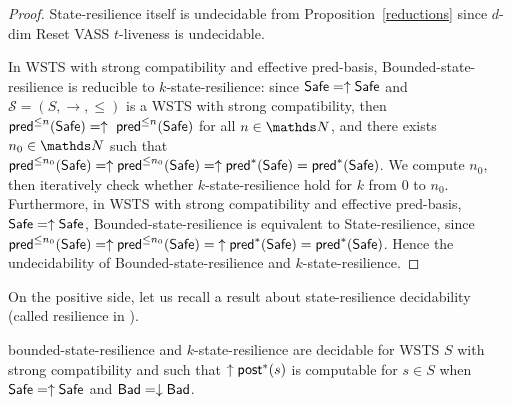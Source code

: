 \begin{proof}
{\sc State-resilience} itself is undecidable from Proposition~\ref{reductions} since {$d$-dim Reset VASS $t$-liveness} is undecidable.


In WSTS with strong compatibility and effective pred-basis, {\sc Bounded-state-resilience} is
reducible to {\sc $k$-state-resilience}:
% 
since $\Safe=\uparrow \Safe$ and
$\mathscr{S}=(S,\rightarrow,\leq)$ is a WSTS with strong %
compatibility, then $\textsf{pred}^{\leq n}(\textsf{Safe})= \uparrow~\textsf{pred}^{\leq n}(\textsf{Safe})$ for all $n \in \N$,
and there exists $n_0 \in \N$ such that 
$\textsf{pred}^{\leq n_0}(\textsf{Safe}) = \uparrow \textsf{pred}^{\leq n_0}(\textsf{Safe}) = \uparrow \textsf{pred}^*(\textsf{Safe}) = \textsf{pred}^*(\textsf{Safe})$.
We compute 
$n_0$, then iteratively check whether $k$-state-resilience 
hold for $k$ from $0$ to $n_0$.  
Furthermore, in WSTS with strong compatibility and effective pred-basis,  $\Safe=\uparrow \Safe$, {\sc Bounded-state-resilience} is equivalent to {\sc State-resilience},
%
since 
$\textsf{pred}^{\leq n_0}(\textsf{Safe}) = \uparrow \textsf{pred}^{\leq n_0}(\textsf{Safe}) = {\uparrow \textsf{pred}^*(\textsf{Safe})} = \textsf{pred}^*(\textsf{Safe})$.
Hence the %
 undecidability of {\sc Bounded-state-resilience}
and 
 {\sc $k$-state-resilience}.
%
%
\iffalse
Bounded state-resilience and 
$k$ state-resilience are undecidable for strongly compatible WSTS with effective pred-basis
when
$\Safe=\uparrow \Safe$
and $\Bad=\downarrow \Bad$.
\fi
%
\end{proof}






On the positive side, let us recall a result about state-resilience decidability (called resilience in \cite{DBLP:conf/gg/Ozkan22,DBLP:journals/corr/abs-2108-00889}).

\begin{theorem}\cite{DBLP:conf/gg/Ozkan22,DBLP:journals/corr/abs-2108-00889}\label{ref ozkan}
{\sc bounded-state-resilience} and {\sc $k$-state-resilience} are decidable for WSTS $S$ with strong compatibility and such that $\uparrow \textsf{post}^*(s)$ is computable for $s \in S$
when
$\Safe=\uparrow \Safe$
and $\Bad=\downarrow \Bad$.
\end{theorem}

